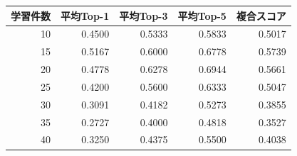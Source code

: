 \begin{tabular}{r r r r r}
\hline
学習件数 & 平均Top-1 & 平均Top-3 & 平均Top-5 & 複合スコア \\
\hline
10 & 0.4500 & 0.5333 & 0.5833 & 0.5017 \\
15 & 0.5167 & 0.6000 & 0.6778 & 0.5739 \\
20 & 0.4778 & 0.6278 & 0.6944 & 0.5661 \\
25 & 0.4200 & 0.5600 & 0.6333 & 0.5047 \\
30 & 0.3091 & 0.4182 & 0.5273 & 0.3855 \\
35 & 0.2727 & 0.4000 & 0.4818 & 0.3527 \\
40 & 0.3250 & 0.4375 & 0.5500 & 0.4038 \\
\hline
\end{tabular}
